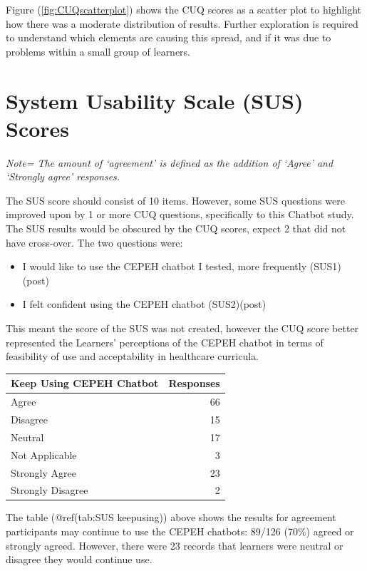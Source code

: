 \documentclass[a4paper, nobind]{templates/ociamthesis}
\providecommand{\tightlist}{%
  \setlength{\itemsep}{0pt}\setlength{\parskip}{0pt}}
\begin{document}
Figure (\ref{fig:CUQscatterplot}) shows the CUQ scores as a scatter plot to highlight how there was a moderate distribution of results.
Further exploration is required to understand which elements are causing this spread, and if it was due to problems within a small group of learners.

\hypertarget{system-usability-scale-sus-scores}{%
\section{System Usability Scale (SUS) Scores}\label{system-usability-scale-sus-scores}}

\emph{Note= The amount of `agreement' is defined as the addition of `Agree'
and `Strongly agree' responses.}

The SUS score should consist of 10 items. However, some SUS questions were improved upon by 1 or more CUQ questions, specifically to this Chatbot study. The SUS results would be obscured by the CUQ scores, expect 2 that did not have cross-over. The two questions were:

\begin{itemize}
\tightlist
\item
  I would like to use the CEPEH chatbot I tested, more frequently
  (SUS1)(post)
\item
  I felt confident using the CEPEH chatbot (SUS2)(post)
\end{itemize}

This meant the score of the SUS was not created, however the CUQ score better represented the Learners' perceptions of the CEPEH chatbot in terms of feasibility of use and acceptability in healthcare curricula.

\begin{longtable}[]{@{}lr@{}}
\toprule()
Keep Using CEPEH Chatbot & Responses \\
\midrule()
\endhead
Agree & 66 \\
Disagree & 15 \\
Neutral & 17 \\
Not Applicable & 3 \\
Strongly Agree & 23 \\
Strongly Disagree & 2 \\
\bottomrule()
\end{longtable}

The table (@ref(tab:SUS keepusing)) above shows the results for agreement participants may
continue to use the CEPEH chatbots: 89/126 (70\%) agreed or strongly agreed. However, there were 23 records that learners were neutral or disagree they would continue use.
\end{document}

